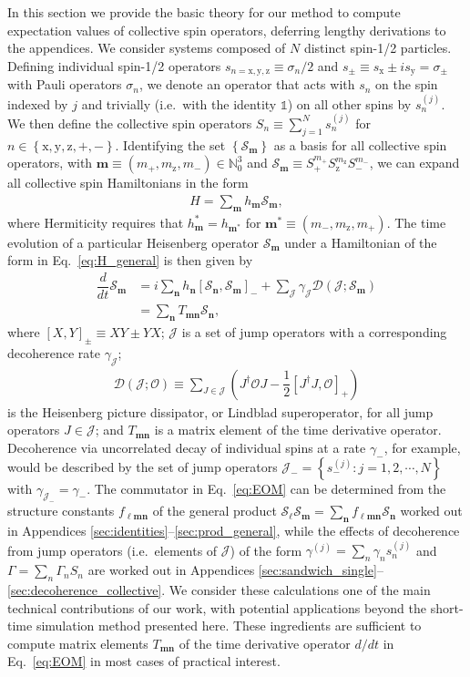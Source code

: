 \documentclass[pra,reprint,longbibliography]{revtex4-1}
\newcommand{\f}[2]{\dfrac{#1}{#2}} %
\newcommand{\p}[1]{\left(#1\right)} %
\renewcommand{\sp}[1]{\left[#1\right]} %
\renewcommand{\set}[1]{\left\{#1\right\}} %
\renewcommand{\v}{\bm} %
\newcommand{\D}{\mathcal{D}}
\newcommand{\J}{\mathcal{J}}
\renewcommand{\O}{\mathcal{O}}
\renewcommand{\S}{\mathcal{S}}
\newcommand{\N}{\mathbb{N}}
\newcommand{\z}{\text{z}}
\newcommand{\x}{\text{x}}
\newcommand{\y}{\text{y}}
\newcommand{\1}{\mathds{1}}
\begin{document}
In this section we provide the basic theory for our method to compute
expectation values of collective spin operators, deferring lengthy
derivations to the appendices.  We consider systems composed of $N$
distinct spin-1/2 particles.  Defining individual spin-1/2 operators
$s_{n=\x,\y,\z}\equiv\sigma_n/2$ and
$s_\pm\equiv s_\x\pm is_\y=\sigma_\pm$ with Pauli operators
$\sigma_n$, we denote an operator that acts with $s_n$ on the spin
indexed by $j$ and trivially (i.e.~with the identity $\1$) on all
other spins by $s_n^{(j)}$.  We then define the collective spin
operators $S_n\equiv\sum_{j=1}^Ns_n^{(j)}$ for
$n\in\set{\x,\y,\z,+,-}$.  Identifying the set $\set{\S_{\v m}}$ as a
basis for all collective spin operators, with
$\v m\equiv\p{m_+,m_\z,m_-}\in\N_0^3$ and
$\S_{\v m}\equiv S_+^{m_+} S_\z^{m_\z} S_-^{m_-}$, we can expand all
collective spin Hamiltonians in the form
\begin{align}
  H = \sum_{\v m} h_{\v m} \S_{\v m},
  \label{eq:H_general}
\end{align}
where Hermiticity requires that $h_{\v m}^*=h_{\v m^*}$ for
$\v m^*\equiv\p{m_-,m_\z,m_+}$.  The time evolution of a particular
Heisenberg operator $\S_{\v m}$ under a Hamiltonian of the form in
Eq.~\eqref{eq:H_general} is then given by
\begin{align}
  \f{d}{dt}\S_{\v m}
  &= i\sum_{\v n}h_{\v n}\sp{\S_{\v n},\S_{\v m}}_-
  + \sum_\J \gamma_\J \D\p{\J;\S_{\v m}} \\
  &= \sum_{\v n} T_{\v m\v n} \S_{\v n},
  \label{eq:EOM}
\end{align}
where $\sp{X,Y}_\pm\equiv XY\pm YX$; $\J$ is a set of jump operators
with a corresponding decoherence rate $\gamma_\J$;
\begin{align}
  \D\p{\J;\O}
  \equiv \sum_{J\in\J} \p{J^\dag \O J - \f12\sp{J^\dag J,\O}_+}
\end{align}
is the Heisenberg picture dissipator, or Lindblad superoperator, for
all jump operators $J\in\J$; and $T_{\v m\v n}$ is a matrix element of
the time derivative operator.  Decoherence via uncorrelated decay of
individual spins at a rate $\gamma_-$, for example, would be described
by the set of jump operators $\J_-=\set{s_-^{(j)}:j=1,2,\cdots,N}$
with $\gamma_{\J_-}=\gamma_-$.  The commutator in Eq.~\eqref{eq:EOM}
can be determined from the structure constants $f_{\v\ell\v m\v n}$ of
the general product
$\S_{\v\ell}\S_{\v m}=\sum_{\v n}f_{\v\ell\v m\v n}\S_{\v n}$ worked
out in Appendices \ref{sec:identities}--\ref{sec:prod_general}, while
the effects of decoherence from jump operators (i.e.~elements of $\J$)
of the form $\gamma^{(j)}=\sum_n\gamma_ns_n^{(j)}$ and
$\Gamma=\sum_n\Gamma_nS_n$ are worked out in Appendices
\ref{sec:sandwich_single}--\ref{sec:decoherence_collective}.  We
consider these calculations one of the main technical contributions of
our work, with potential applications beyond the short-time simulation
method presented here.  These ingredients are sufficient to compute
matrix elements $T_{\v m\v n}$ of the time derivative operator $d/dt$
in Eq.~\eqref{eq:EOM} in most cases of practical interest.
\end{document}
